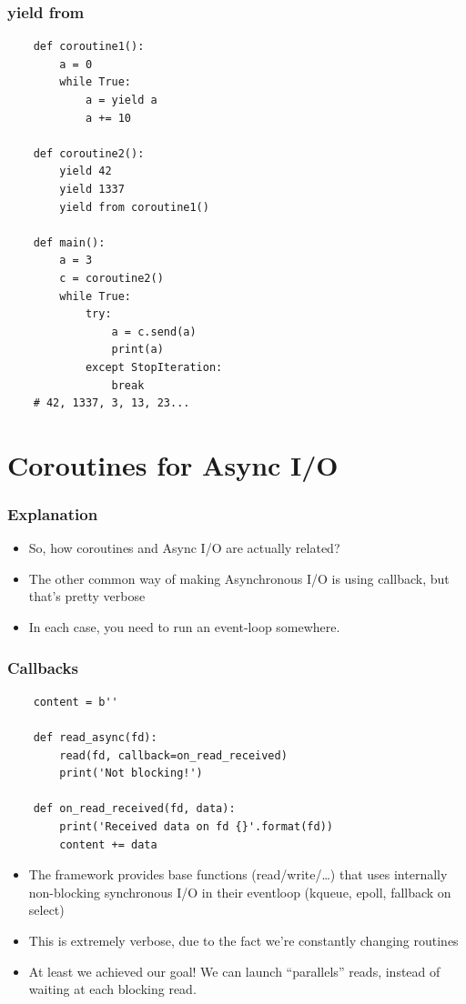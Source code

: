 \documentclass[ignorenonframetext,]{beamer}
\begin{document}
\begin{frame}[fragile]\frametitle{yield from}

\tiny{
\begin{verbatim}
    def coroutine1():
        a = 0
        while True:
            a = yield a
            a += 10

    def coroutine2():
        yield 42
        yield 1337
        yield from coroutine1()

    def main():
        a = 3
        c = coroutine2()
        while True:
            try:
                a = c.send(a)
                print(a)
            except StopIteration:
                break
    # 42, 1337, 3, 13, 23...
\end{verbatim}
}

\end{frame}

\section{Coroutines for Async I/O}

\begin{frame}[fragile]\frametitle{Explanation}

\begin{itemize}
\itemsep1pt\parskip0pt
\item
  So, how coroutines and Async I/O are actually related?
\item
  The other common way of making Asynchronous I/O is using callback, but
  that's pretty verbose
\item
  In each case, you need to run an event-loop somewhere.
\end{itemize}

\end{frame}

\begin{frame}[fragile]\frametitle{Callbacks}

\tiny{
\begin{verbatim}
    content = b''

    def read_async(fd):
        read(fd, callback=on_read_received)
        print('Not blocking!')

    def on_read_received(fd, data):
        print('Received data on fd {}'.format(fd))
        content += data

\end{verbatim}
}

\begin{itemize}
\itemsep1pt\parskip0pt
\item
  The framework provides base functions (read/write/\ldots{}) that uses
  internally non-blocking synchronous I/O in their eventloop (kqueue,
  epoll, fallback on select)
\item
  This is extremely verbose, due to the fact we're constantly changing
  routines
\item
  At least we achieved our goal! We can launch ``parallels'' reads,
  instead of waiting at each blocking read.
\end{itemize}

\end{frame}
\end{document}
